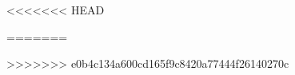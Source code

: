 
\newcommand{\lastversion}{\lastversionST}%
\newcommand{\doctitle}{\doctitleST}%
\newcommand{\info}{\infoST}


{}%


<<<<<<< HEAD

=======



>>>>>>> e0b4c134a600cd165f9c8420a77444f26140270c
